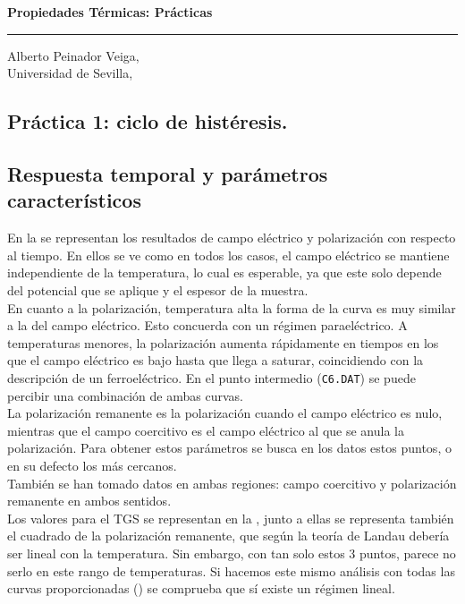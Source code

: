 \documentclass[a4paper, 12pt, spanish]{article}
\begin{document}
\pagestyle{fancy}\setcounter{page}{1}
\pagestyle{headings}
\begin{center}
\LARGE{\textbf{Propiedades Térmicas: Prácticas}} \rule{.9\textwidth}{.05cm}
\end{center}
\begin{flushright}
Alberto Peinador Veiga,\\
Universidad de Sevilla,\\
\Today
\end{flushright}

\begin{multicols}{2}
\section{Práctica 1: ciclo de histéresis.}
\subsection*{Respuesta temporal y parámetros característicos}\label{sec:p1_1}
En la  se representan los resultados de campo eléctrico y polarización con respecto al tiempo.
En ellos se ve como en todos los casos, el campo eléctrico se mantiene independiente de la temperatura, lo cual es esperable, ya que este solo depende del potencial que se aplique y el espesor de la muestra.\\
En cuanto a la polarización, temperatura alta la forma de la curva es muy similar a la del campo eléctrico. Esto concuerda con un régimen paraeléctrico. A temperaturas menores, la polarización aumenta rápidamente en tiempos en los que el campo eléctrico es bajo hasta que llega a saturar, coincidiendo con la descripción de un ferroeléctrico. En el punto intermedio (\texttt{C6.DAT}) se puede percibir una combinación de ambas curvas.\\
La polarización remanente es la polarización cuando el campo eléctrico es nulo, mientras que el campo coercitivo es el campo eléctrico al que se anula la polarización. Para obtener estos parámetros se busca en los datos estos puntos, o en su defecto los más cercanos.\\
También se han tomado datos en ambas regiones: campo coercitivo y polarización remanente en ambos sentidos.\\
Los valores para el TGS se representan en la , junto a ellas se representa también el cuadrado de la polarización remanente, que según la teoría de Landau debería ser lineal con la temperatura. Sin embargo, con tan solo estos 3 puntos, parece no serlo en este rango de temperaturas. Si hacemos este mismo análisis con todas las curvas proporcionadas () se comprueba que sí existe un régimen lineal.


\end{multicols}
\end{document}
